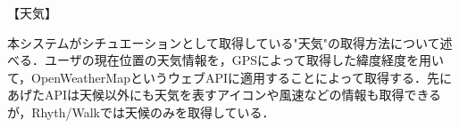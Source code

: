 【天気】
\par
本システムがシチュエーションとして取得している"天気"の取得方法について述べる．ユーザの現在位置の天気情報を，GPSによって取得した緯度経度を用いて，OpenWeatherMapというウェブAPIに適用することによって取得する．先にあげたAPIは天候以外にも天気を表すアイコンや風速などの情報も取得できるが，Rhyth/Walkでは天候のみを取得している．
